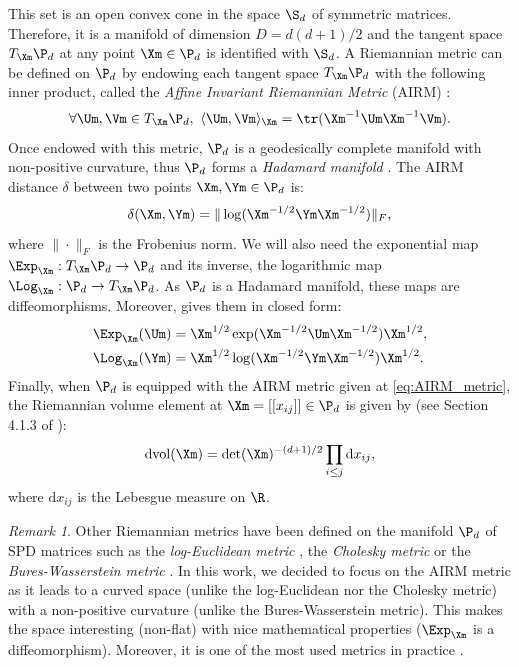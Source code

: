 \documentclass[10pt]{article} %
\theoremstyle{plain}
\theoremstyle{definition}
\theoremstyle{remark}
\newtheorem{remark}[theorem]{Remark}
\begin{document}
This set is an open convex cone in the space $\S_d$ of symmetric matrices. Therefore, it is a manifold of dimension $D = d(d+1)/2$ and the tangent space $T_{\Xm} \P_d$ at any point $\Xm \in \P_d$ is identified with $\S_d$. A Riemannian metric can be defined on $\P_d$ by endowing each tangent space $T_{\Xm}\P_d$ with the following inner product, called the \emph{Affine Invariant Riemannian Metric} (AIRM) \citep{pennecManifoldvaluedImageProcessing2020}:
\begin{equation}
  \forall \Um,\Vm \in T_{\Xm}\P_d,~\langle \Um,\Vm\rangle_{\Xm} = \tr(\Xm^{-1}\Um\Xm^{-1}\Vm).
  \label{eq:AIRM_metric}
\end{equation}
Once endowed with this metric, $\P_d$ is a geodesically complete manifold with non-positive curvature, thus $\P_d$ forms a \emph{Hadamard manifold} \citep{shigaHadamardManifolds1984}. The AIRM distance $\delta$ between two points $\Xm,\Ym \in \P_d$ is:
\begin{equation}
  \label{eq:distance_spd}
  \delta(\Xm,\Ym) = \|\log(\Xm^{-1/2}\Ym\Xm^{-1/2})\|_F,
\end{equation}
where $\|\cdot\|_F$ is the Frobenius norm. We will also need the exponential map $\Exp_{\Xm} : T_{\Xm}\P_d \to \P_d$ and its inverse, the logarithmic map $\Log_{\Xm} : \P_d \to T_{\Xm}\P_d$. As $\P_d$ is a Hadamard manifold, these maps are diffeomorphisms. Moreover, \citet{bhatiaPositiveDefiniteMatrices2007} gives them in closed form:
\begin{equation}
  \label{eq:exp_log_riem}
  \begin{aligned}
    \Exp_{\Xm}(\Um) &= \Xm^{1/2}\exp(\Xm^{-1/2}\Um\Xm^{-1/2})\Xm^{1/2}, \\
    \Log_{\Xm}(\Ym) &= \Xm^{1/2}\log(\Xm^{-1/2}\Ym\Xm^{-1/2})\Xm^{1/2}.
  \end{aligned}
\end{equation}
Finally, when $\P_d$ is equipped with the AIRM metric given at \cref{eq:AIRM_metric}, the Riemannian volume element at $\Xm = [[x_{ij}]] \in \P_d$ is given by (see Section 4.1.3 of \citealt{terrasHarmonicAnalysisSymmetric1988}):
\begin{equation}
  \label{eq:volume}
  \mathrm{d} \text{vol}(\Xm) = \det(\Xm)^{-(d+1)/2} \prod_{i \leq j} \mathrm{d}x_{ij},
\end{equation}
where $\mathrm{d}x_{ij}$ is the Lebesgue measure on $\R$.

\begin{remark}
  Other Riemannian metrics have been defined on the manifold $\P_d$ of SPD matrices such as the \emph{log-Euclidean metric} \citep{arsigny2007geometric}, the \emph{Cholesky metric} \citep{dryden2009non} or the \emph{Bures-Wasserstein metric} \citep{bhatia2019bures}. In this work, we decided to focus on the AIRM metric as it leads to a curved space (unlike the log-Euclidean nor the Cholesky metric) with a non-positive curvature (unlike the Bures-Wasserstein metric). This makes the space interesting (non-flat) with nice mathematical properties ($\Exp_{\Xm}$ is a diffeomorphism). Moreover, it is one of the most used metrics in practice \citep{chevallier2021review}.
\end{remark}
\end{document}
